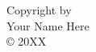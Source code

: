 \documentclass[../main.tex]{subfiles}
\begin{document}
	\vspace*{\fill}
	\begin{center}
		Copyright by\\
		Your Name Here\\
		\copyright{} 20XX
	\end{center}
	\vspace*{\fill}
	\clearpage
\end{document}
